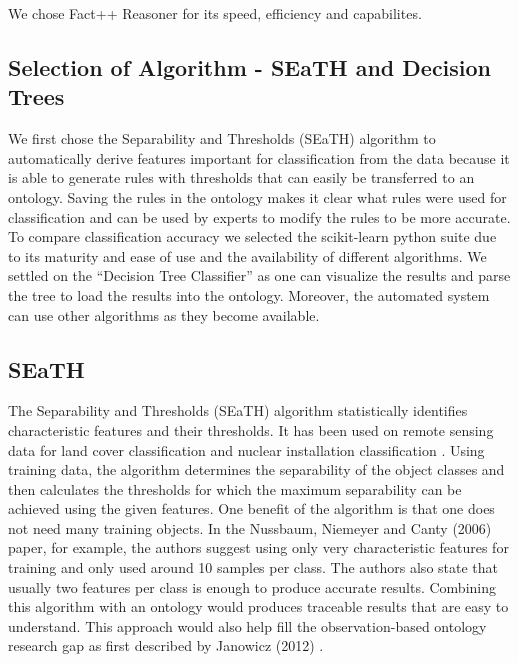 \documentclass[authoryear, review,12pt,number]{elsarticle}
\begin{document}
We chose Fact++ Reasoner for its speed, efficiency and
capabilites.

\subsection{Selection of Algorithm - SEaTH and Decision Trees}
We first chose the Separability and Thresholds
(SEaTH) \citep{Nussbaum2006} algorithm to automatically derive features important
for classification from the data because it is able to generate rules with
thresholds that can easily be transferred to an ontology. Saving the rules in
the ontology makes it clear what rules were used for classification and can be
used by experts to modify the rules to be more accurate. To compare
classification accuracy we selected the scikit-learn python suite
\citep{scikit-learn} due to its maturity and ease of use and the availability of
different algorithms. We settled on the ``Decision Tree Classifier'' as one can
visualize the results and parse the tree to load the results into the ontology.
Moreover, the automated system can use other algorithms as they become available.
\subsection{SEaTH} The Separability and Thresholds (SEaTH) algorithm
\citep{Nussbaum2006} statistically identifies characteristic features and their thresholds. It has
been used on remote sensing data for land cover classification \citep{Gao2011}
and nuclear installation classification \citep{Nussbaum2006}.
Using training data, the algorithm determines the separability of the object
classes and then calculates the thresholds for which the maximum separability
can be achieved using the given features. One benefit of the algorithm is that
one does not need many training objects.
In the Nussbaum, Niemeyer and Canty (2006) paper, for example, the authors
suggest using only very characteristic features for training and only used
around 10 samples per class\citep{Nussbaum2006}. The authors also state that
usually two features per class is enough to produce accurate results. Combining
this algorithm with an ontology would produces traceable results that are easy
to understand. This approach would also help fill the observation-based ontology
research gap as first described by Janowicz (2012) \citep{Janowicz2012}.
\end{document}
